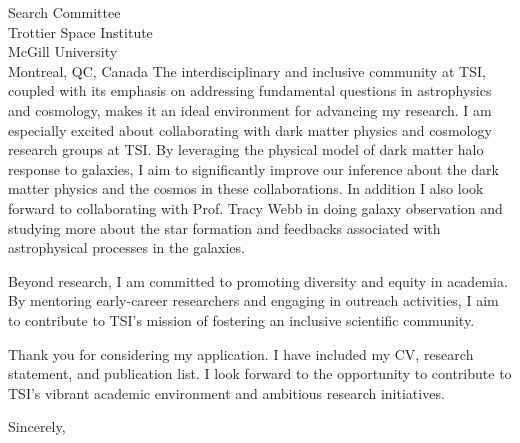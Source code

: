 \documentclass[11pt]{letter}
\begin{document}
\begin{letter}{Search Committee \\ Trottier Space Institute \\ McGill University \\ Montreal, QC, Canada}
The interdisciplinary and inclusive community at TSI, coupled with its emphasis on addressing fundamental questions in astrophysics and cosmology, makes it an ideal environment for advancing my research. I am especially excited about collaborating with dark matter physics and cosmology research groups at TSI. By leveraging the physical model of dark matter halo response to galaxies, I aim to significantly improve our inference about the dark matter physics and the cosmos in these collaborations. In addition I also look forward to collaborating with Prof. Tracy Webb in doing galaxy observation and studying more about the star formation and feedbacks associated with astrophysical processes in the galaxies.

Beyond research, I am committed to promoting diversity and equity in academia. By mentoring early-career researchers and engaging in outreach activities, I aim to contribute to TSI's mission of fostering an inclusive scientific community.

Thank you for considering my application. I have included my CV, research statement, and publication list. I look forward to the opportunity to contribute to TSI's vibrant academic environment and ambitious research initiatives.

\closing{Sincerely,}

\end{letter}
\end{document}
